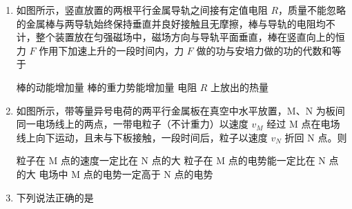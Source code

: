 \documentclass[\gkver]{gaokaozhenti}
\begin{document}
\begin{enumerate}

\item
如图所示，竖直放置的两根平行金属导轨之间接有定值电阻 $R$，质量不能忽略的金属棒与两导轨始终保持垂直并良好接触且无摩擦，棒与导轨的电阻均不计，整个装置放在匀强磁场中，磁场方向与导轨平面垂直，棒在竖直向上的恒力 $F$ 作用下加速上升的一段时间内，力 $F$ 做的功与安培力做的功的代数和等于


{棒的动能增加量}
{棒的重力势能增加量}
{电阻 $R$ 上放出的热量}


\item
如图所示，带等量异号电荷的两平行金属板在真空中水平放置，M、N 为板间同一电场线上的两点，一带电粒子（不计重力）以速度 $v_{M}$ 经过 M 点在电场线上向下运动，且未与下板接触，一段时间后，粒子以速度 $v_{N}$ 折回 N 点。则


{粒子在 M 点的速度一定比在 N 点的大}
{粒子在 M 点的电势能一定比在 N 点的大}
{电场中 M 点的电势一定高于 N 点的电势}


\item
下列说法正确的是


\end{enumerate}
\end{document}
